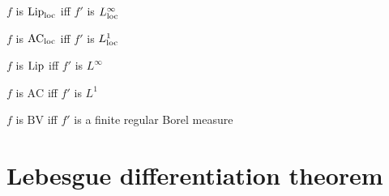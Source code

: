 \documentclass{../note}
\begin{document}
\begin{parts}
\item $f$ is $\operatorname{Lip}_{\mathrm{loc}}$ iff $f'$ is $L_{\mathrm{loc}}^\infty$
\item $f$ is $\textrm{AC}_{\mathrm{loc}}$ iff $f'$ is $L_{\mathrm{loc}}^1$
\end{parts}
\begin{parts}
\item $f$ is $\operatorname{Lip}$ iff $f'$ is $L^\infty$
\item $f$ is $\textrm{AC}$ iff $f'$ is $L^1$
\item $f$ is $\textrm{BV}$ iff $f'$ is a finite regular Borel measure
\end{parts}



\chapter{Lebesgue differentiation theorem}
\end{document}

